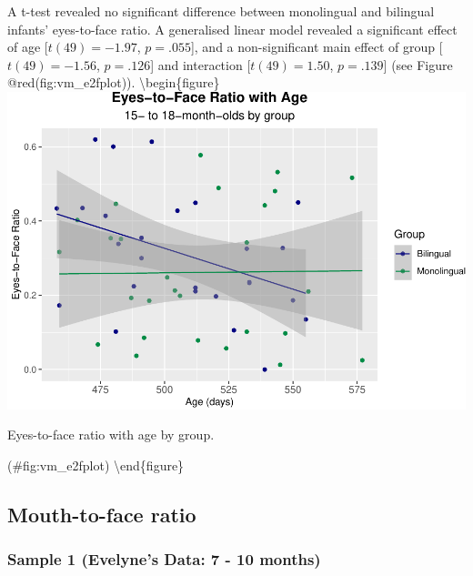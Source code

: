 \documentclass[english,man,floatsintext]{apa6}
\begin{document}
A t-test revealed no significant difference between monolingual and bilingual infants' eyes-to-face ratio. A generalised linear model revealed a significant effect of age {[}\(t(49) = -1.97\), \(p = .055\){]}, and a non-significant main effect of group {[}\(t(49) = -1.56\), \(p = .126\){]} and interaction {[}\(t(49) = 1.50\), \(p = .139\){]} (see Figure @red(fig:vm\_e2fplot)).
\textbackslash{}begin\{figure\}
\includegraphics{Effects_of_early_language_experience_on_infants_files/figure-latex/vm_e2fplot-1}

\caption{Eyes-to-face ratio with age by group.}

(\#fig:vm\_e2fplot)
\textbackslash{}end\{figure\}

\hypertarget{mouth-to-face-ratio}{%
\subsection{Mouth-to-face ratio}\label{mouth-to-face-ratio}}

\hypertarget{sample-1-evelynes-data-7---10-months-4}{%
\subsubsection{Sample 1 (Evelyne's Data: 7 - 10 months)}\label{sample-1-evelynes-data-7---10-months-4}}
\end{document}
